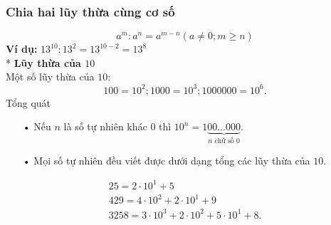\begin{tomtat}
	\subsubsection{Chia hai lũy thừa cùng cơ số}
\[{a^m}:{a^n} = {a^{m - n}} \text{} (a \neq 0; m \geq n)\]
\textbf{Ví dụ:} $13^{10}: 13^2 = 13^{10-2}=13^8$ \vspace{0,3cm}\\
* \textbf{Lũy thừa của $10$}\\
Một số lũy thừa của $10$:
$$100 = 10^2; 1 000 = 10^3; 1 000 000 = 10^6.$$
Tổng quát
\begin{itemize}
\item[•] Nếu $n$ là số tự nhiên khác $0$ thì ${10^n} = 1\underbrace {00...000}_{n \text{ chữ số }0}$.
\item[•] Mọi số tự nhiên đều viết được dưới dạng tổng các lũy thừa của $10$.
\end{itemize}
\begin{vd}
\[\begin{array}{l}
25 = 2 \cdot {10^1} + 5\\
429 = 4 \cdot {10^2} + 2 \cdot {10^1} + 9\\
3258 = 3 \cdot {10^3} + 2 \cdot {10^2} + 5 \cdot {10^1} + 8.
\end{array}\]
\end{vd}
\end{tomtat}

